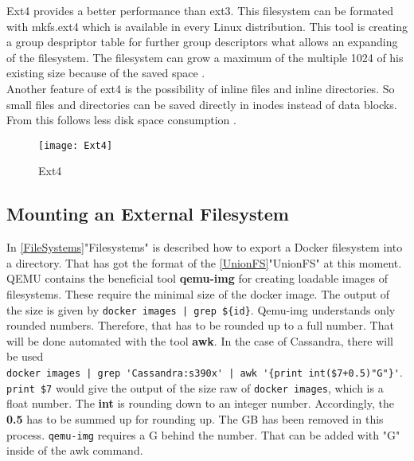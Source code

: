 Ext4 provides a better performance than ext3. 
This filesystem can be formated with mkfs.ext4 which is available in every Linux distribution.
This tool is creating a group despriptor table for further group descriptors what allows an expanding of the filesystem. The filesystem can grow a maximum of the multiple 1024 of his existing size because of the saved space \cite[~p.21]{Seufert2015}. \\

Another feature of ext4 is the possibility of inline files and inline directories. So small files and directories can be saved directly in inodes instead of data blocks. From this follows less disk space consumption \cite[p.24]{Seufert2015}.

\begin{figure}[H]
\centering
\texttt{[image: Ext4]}
 \caption{Ext4}
    \label{Ext4}
\end{figure}

\subsection{Mounting an External Filesystem}

In \ref{FileSystems}"Filesystems" is described how to export a Docker filesystem into a directory. That has got the format of the \ref{UnionFS}"UnionFS" at this moment. QEMU contains the beneficial tool \textbf{qemu-img} for creating loadable images of filesystems. These require the minimal size of the docker image. The output of the size is given by \lstinline!docker images | grep ${id}!. Qemu-img understands only rounded numbers. Therefore, that has to be rounded up to a full number. That will be done automated with the tool \textbf{awk}. 
In the case of Cassandra, there will be used \\
\lstinline!docker images | grep 'Cassandra:s390x' | awk '{print int($7+0.5)"G"}'!. \\
\lstinline!print $7! would give the output of the size raw of \lstinline!docker images!, which is a float number. The \textbf{int} is rounding down to an integer number. Accordingly, the \textbf{0.5} has to be summed up for rounding up. The GB has been removed in this process. \lstinline!qemu-img! requires a G behind the number. That can be added with "G" inside of the awk command. \\

